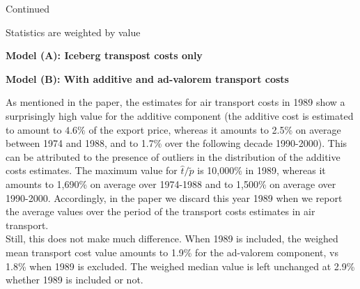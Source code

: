 \documentclass[11pt,twoside, authoryear]{elsarticle}
\begin{document}
\begin{landscape}
\begin{table}[htbp]
\begin{center}
	\end{center}
	\label{tab_oa:result_air_ally3}%
\end{table}%

\begin{table}[htbp]
	
	\caption{Continued}
	\begin{center}
		
		
				\begin{tablenotes}
			\tiny
			\item Statistics are weighted by value
			\item \textbf{Model (A): Iceberg transpost costs only}
			\item \textbf{Model (B): With additive and ad-valorem transport costs}
		\end{tablenotes}
		
	\end{center}
	\label{tab_oa:result_air_ally3}%
\end{table}%
\end{landscape}

As mentioned in the paper, the estimates for air transport costs in 1989 show a surprisingly high value for the additive component (the additive cost is estimated to amount to $4.6\%$ of the export price, whereas it amounts to 2.5\% on average between 1974 and 1988, and to 1.7\% over the following decade 1990-2000). This can be attributed to the presence of outliers in the distribution of the additive costs estimates. The maximum value for $\widehat{t}/\widetilde{p}$ is 10,000\% in 1989, whereas it amounts to 1,690\% on average over 1974-1988 and to 1,500\% on average over 1990-2000. Accordingly, in the paper we discard this year 1989 when we report the average values over the period of the transport costs estimates in air transport.\\
Still, this does not make much difference. When 1989 is included, the weighed mean transport cost value amounts to 1.9\% for the ad-valorem component, vs 1.8\% when 1989 is excluded. The weighed median value is left unchanged at 2.9\% whether 1989 is included or not.
\end{document}
